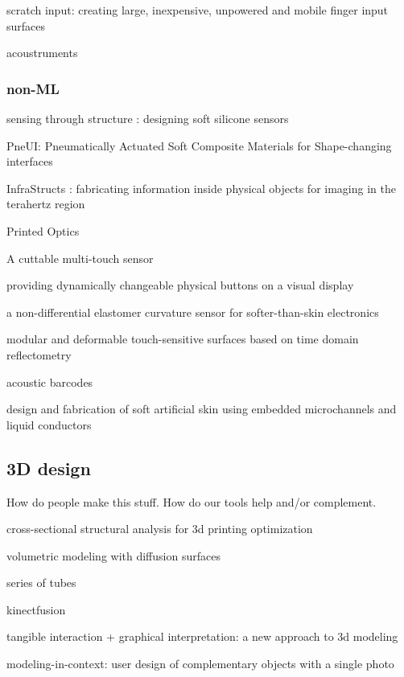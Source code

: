 \cite{harrison-scratchinput} scratch input: creating large, inexpensive, unpowered and mobile finger input surfaces

\cite{laput-acoustruments} acoustruments

\subsubsection{non-ML}

\cite{slyper-structure} sensing through structure : designing soft silicone sensors

\cite{yao-pneui} PneUI: Pneumatically Actuated Soft Composite Materials for Shape-changing interfaces

\cite{willis-infrastructs} InfraStructs : fabricating information inside physical objects for imaging in the terahertz region

\cite{willis-printedoptics} Printed Optics

\cite{olberding-cuttable} A cuttable multi-touch sensor

\cite{harrison-buttons} providing dynamically changeable physical buttons on a visual display

\cite{majidi-curvature} a non-differential elastomer curvature sensor for softer-than-skin electronics

\cite{wimmer-tdr} modular and deformable touch-sensitive surfaces based on time domain reflectometry

\cite{harrison-acoustic} acoustic barcodes

\cite{park-microchannels} design and fabrication of soft artificial skin using embedded microchannels and liquid conductors

\subsection{3D design}
How do people make this stuff. How do our tools help and/or complement.

\cite{umetani-strength} cross-sectional structural analysis for 3d printing optimization

\cite{takayama-volumetric} volumetric modeling with diffusion surfaces

\cite{savage-sot} series of tubes

\cite{molyneaux-kinectfuson} kinectfusion

\cite{anderson-tangible} tangible interaction + graphical interpretation: a new approach to 3d modeling

\cite{lau-modeling} modeling-in-context: user design of complementary objects with a single photo

